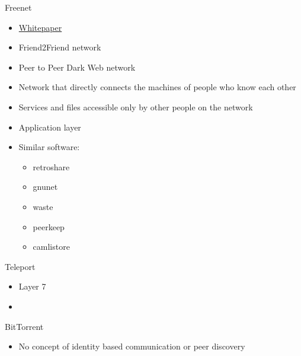 \label{notes__02140-freenet.md}
\begin{block}{Freenet}
\label{notes__02140-freenet.md__freenet}
\begin{itemize}
\tightlist
\item
  \href{https://homepage.divms.uiowa.edu/~ghosh/freenet.pdf}{Whitepaper}
\item
  Friend2Friend network
\item
  Peer to Peer Dark Web network
\item
  Network that directly connects the machines of people who know each other
\item
  Services and files accessible only by other people on the network
\item
  Application layer
\item
  Similar software:

  \begin{itemize}
  \tightlist
  \item
    retroshare
  \item
    gnunet
  \item
    waste
  \item
    peerkeep
  \item
    camlistore
  \end{itemize}
\end{itemize}
\end{block}

\label{notes__02150-teleport.md}
\begin{block}{Teleport}
\label{notes__02150-teleport.md__teleport}
\begin{itemize}
\tightlist
\item
  Layer 7
\item
\end{itemize}
\end{block}

\label{notes__02160-bittorrent.md}
\begin{block}{BitTorrent}
\label{notes__02160-bittorrent.md__bittorrent}
\begin{itemize}
\tightlist
\item
  No concept of identity based communication or peer discovery
\end{itemize}
\end{block}

